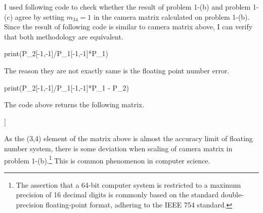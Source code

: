 \documentclass[10pt]{article}
\begin{document}
I used following code to check whether the result of problem 1-(b) and problem 1-(c) agree by setting $m_{34} = 1$ in the camera matrix calculated on problem 1-(b).
Since the result of following code is similar to camera matrix above, I can verify that both methodology are equivalent. 
\begin{python}
print(P_2[-1,-1]/P_1[-1,-1]*P_1)
\end{python}
The reason they are not exactly same is the floating point number error. 
\begin{python}
print(P_2[-1,-1]/P_1[-1,-1]*P_1 - P_2)
\end{python}
The code above returns the following matrix.
\begin{python}
[[-1.86427717e-05 -3.19670417e-05  9.93167477e-05  1.26469280e-02]
 [ 6.08843664e-06 -9.04052567e-06  4.56969897e-05 -4.92271847e-04]
 [ 2.54860563e-08 -3.33770907e-08  7.71079873e-08 -1.11022302e-16]]
\end{python}
As the (3,4) element of the matrix above is almost the accuracy limit of floating number system, there is some deviation when scaling of camera matrix in problem 1-(b).\footnote{The assertion that a 64-bit computer system is restricted to a maximum precision of 16 decimal digits is commonly based on the standard double-precision floating-point format, adhering to the IEEE 754 standard.}
This is common phenomenon in computer science.
\end{document}
